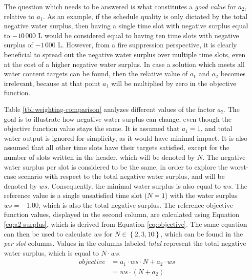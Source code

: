 The question which needs to be answered is what constitutes a \textit{good value} for $a_2$, relative to $a_1$.
As an example, if the schedule quality is only dictated by the total negative water surplus, then having a single time slot with negative surplus equal to $-10\,000$ L would be considered equal to having ten time slots with negative surplus of $-1\,000$ L.
However, from a fire suppression perspective, it is clearly beneficial to spread out the negative water surplus over multiple time slots, even at the cost of a higher negative water surplus.
In case a solution which meets all water content targets can be found, then the relative value of $a_1$ and $a_2$ becomes irrelevant, because at that point $a_1$ will be multiplied by zero in the objective function.

Table \ref{tbl:weighting-comparison} analyzes different values of the factor $a_2$.
The goal is to illustrate how negative water surplus can change, even though the objective function value stays the same.
It is assumed that $a_1 = 1$, and total water output is ignored for simplicity, as it would have minimal impact.
It is also assumed that all other time slots have their targets satisfied, except for the number of slots written in the header, which will be denoted by $N$.
The negative water surplus per slot is considered to be the same, in order to explore the worst-case scenario with respect to the total negative water surplus, and will be denoted by $\mathit{ws}$.
Consequently, the minimal water surplus is also equal to $\mathit{ws}$.
The reference value is a single unsatisfied time slot ($N = 1$) with the water surplus $\mathit{ws} = -1.00$, which is also the total negative surplus.
The reference objective function values, displayed in the second column, are calculated using Equation \ref{eq:a2-surplus}, which is derived from Equation \ref{eq:objective}.
The same equation can then be used to calculate $\mathit{ws}$ for $N \in \left\{ 2, 3, 10 \right\}$, which can be found in the \textit{per slot} columns.
Values in the columns labeled \textit{total} represent the total negative water surplus, which is equal to $N \cdot \mathit{ws}$.
\begin{equation}\label{eq:a2-surplus}
\begin{split}
\mathit{objective} &= a_1 \cdot \mathit{ws} \cdot N + a_2 \cdot \mathit{ws} \\
                   &= \mathit{ws} \cdot (N + a_2)
\end{split}
\end{equation}

